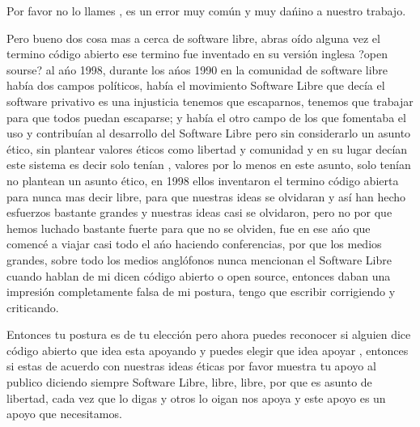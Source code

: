 \begin{multicols}{2}
\begin{entradilla} %
Por favor no lo llames {\em {\color{introcolor}{ Linux}}}, es un error muy común y muy dańino a nuestro trabajo.
\end{entradilla}
Pero bueno dos cosa mas a cerca de software libre, abras oído alguna vez el termino código abierto ese termino fue inventado en su versión inglesa ?open sourse? al ańo 1998, durante los ańos 1990 en la comunidad de software libre había dos campos políticos, había el movimiento Software Libre que decía {\em {\color{introcolor}{lo hacemos por la libertad, }}} el software privativo es una injusticia tenemos que escaparnos, tenemos que trabajar para que todos puedan escaparse; y había el otro campo de los que fomentaba el uso y contribuían al  desarrollo del Software Libre pero sin considerarlo un asunto ético, sin plantear valores éticos como libertad y comunidad y en su lugar decían  este sistema es decir solo tenían , valores por lo menos en este asunto, solo tenían{\em {\color{introcolor}{valores prácticos de comodidad, }}} no plantean un asunto ético, en 1998 ellos inventaron el termino código abierta para nunca mas decir libre, para que nuestras ideas se olvidaran y así han hecho esfuerzos bastante grandes y nuestras ideas casi se olvidaron, pero no por que hemos luchado bastante fuerte para que no se olviden, fue en ese ańo que comencé a viajar casi todo el ańo haciendo  conferencias, por que los medios grandes, sobre todo los medios anglófonos nunca mencionan el Software Libre cuando hablan de mi dicen código abierto o open source, entonces daban una impresión completamente falsa de mi postura, tengo que escribir corrigiendo y  criticando.

Entonces tu postura es de tu elección pero ahora puedes reconocer si alguien dice código abierto que idea esta apoyando y puedes  elegir que idea apoyar , entonces si estas de acuerdo con nuestras ideas éticas por favor muestra tu apoyo al publico diciendo siempre Software Libre, libre, libre, por que es asunto de libertad, cada vez que lo digas y otros lo oigan nos apoya y este apoyo es un apoyo que necesitamos.



\end{multicols}
